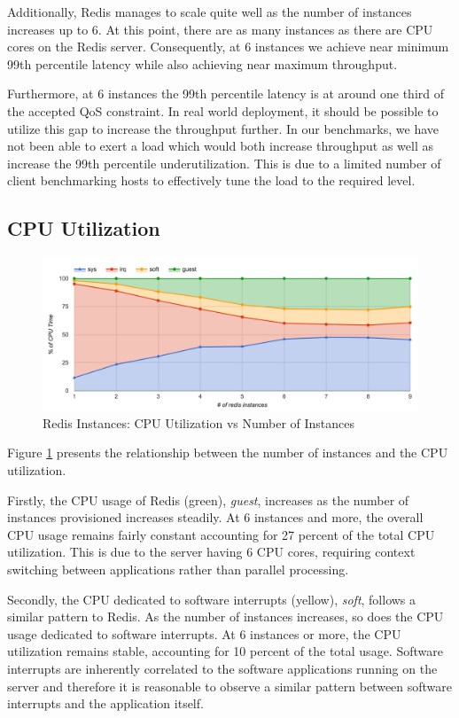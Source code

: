 Additionally, Redis manages to scale quite well as the number of instances increases up to 6. At this point, there are as many instances as there are CPU cores on the Redis server. Consequently, at 6 instances we achieve near minimum 99th percentile latency while also achieving near maximum throughput.

Furthermore, at 6 instances the 99th percentile latency is at around one third of the accepted QoS constraint. In real world deployment, it should be possible to utilize this gap to increase the throughput further. In our benchmarks, we have not been able to exert a load which would both increase throughput as well as increase the 99th percentile underutilization. This is due to a limited number of client benchmarking hosts to effectively tune the load to the required level.


\subsection{CPU Utilization}

\begin{figure}[h]
    \includegraphics[width=\textwidth]{./res/6_instances_cpu.png}
    \caption{Redis Instances: CPU Utilization vs Number of Instances}
    \label{fig:6_instances_cpu.png}
\end{figure}

Figure \ref{fig:6_instances_cpu.png} presents the relationship between the number of instances and the CPU utilization.

Firstly, the CPU usage of Redis (green), \textit{guest}, increases as the number of instances provisioned increases steadily. At 6 instances and more, the overall CPU usage remains fairly constant accounting for 27 percent of the total CPU utilization. This is due to the server having 6 CPU cores, requiring context switching between applications rather than parallel processing.

Secondly, the CPU dedicated to software interrupts (yellow), \textit{soft}, follows a similar pattern to Redis. As the number of instances increases, so does the CPU usage dedicated to software interrupts. At 6 instances or more, the CPU utilization remains stable, accounting for 10 percent of the total usage. Software interrupts are inherently correlated to the software applications running on the server and therefore it is reasonable to observe a similar pattern between software interrupts and the application itself.

